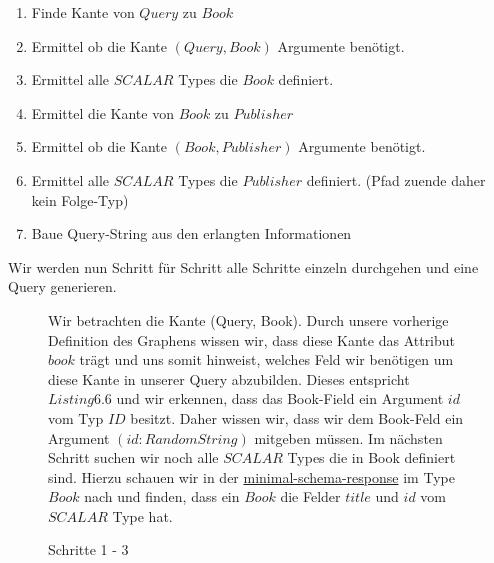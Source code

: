 \begin{enumerate}
    \item Finde Kante von $Query$ zu $Book$
    \item Ermittel ob die Kante $(Query, Book)$ Argumente benötigt.
    \item Ermittel alle $SCALAR$ Types die $Book$ definiert.
    \item Ermittel die Kante von $Book$ zu $Publisher$
    \item Ermittel ob die Kante $(Book, Publisher)$ Argumente benötigt.
    \item Ermittel alle $SCALAR$ Types die $Publisher$ definiert. (Pfad zuende daher kein Folge-Typ)
    \item Baue Query-String aus den erlangten Informationen
\end{enumerate}

Wir werden nun Schritt für Schritt alle Schritte einzeln durchgehen und eine Query generieren.

\begin{figure}[htbp]
    \centering
    \begin{minipage}[t]{0.5\textwidth}
    \end{minipage}%
    \begin{minipage}[t]{0.5\textwidth}
        Wir betrachten die Kante (Query, Book).
        Durch unsere vorherige Definition des Graphens wissen wir, dass diese Kante das Attribut $book$ trägt und uns somit hinweist, welches Feld wir benötigen
        um diese Kante in unserer Query abzubilden.
        Dieses entspricht $Listing 6.6$ und wir erkennen, dass das Book-Field ein Argument $id$ vom Typ $ID$ besitzt.
        Daher wissen wir, dass wir dem Book-Feld ein Argument $(id: RandomString)$ mitgeben müssen.
        Im nächsten Schritt suchen wir noch alle $SCALAR$ Types die in Book definiert sind.
        Hierzu schauen wir in der \hyperref[Schema-Response]{minimal-schema-response} im Type $Book$ nach und finden,
        dass ein $Book$ die Felder $title$ und $id$ vom $SCALAR$ Type hat.
    \end{minipage}
\caption{Schritte 1 - 3}
\end{figure}


